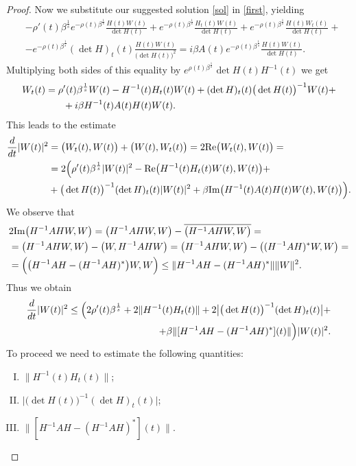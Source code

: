 \documentclass[12pt,oneside,a4paper]{book}
\numberwithin{equation}{section}     %
\theoremstyle{plain}
\theoremstyle{definition}
\newcommand{\Rep}{{\rm Re}}
\newcommand{\Imp}{{\rm Im}}
\begin{document}
\begin{proof}
	Now we substitute our suggested solution \eqref{sol} in \eqref{first}, yielding
	\begin{align*}
	&-\rho'(t)\beta^\frac{1}{s}e^{-\rho(t)\beta^\frac{1}{s}}\frac{H(t)W(t)}{\det H(t)}+e^{-\rho(t)\beta^\frac{1}{s}}\frac{H_t(t)W(t)}{\det H(t)}+e^{-\rho(t)\beta^\frac{1}{s}}\frac{H(t)W_t(t)}{\det H(t)}+\\
	&-e^{-\rho(t)\beta^\frac{1}{s}}(\det H)_t(t)\frac{H(t)W(t)}{\big(\det H(t)\big)^2}=i\beta A(t)e^{-\rho(t)\beta^\frac{1}{s}}\frac{H(t)W(t)}{\det H(t)}.
	\end{align*}
	Multiplying both sides of this equality  by $e^{\rho(t)\beta^{\frac{1}{s}}}\det H(t)H^{-1}(t)$ we get
	\begin{align}\notag
	W_t(t)=\rho&'(t)\beta^{\frac{1}{s}}W(t)-H^{-1}(t)H_t(t)W(t)+(\det H)_t(t)\big(\det H(t)\big)^{-1}W(t)+\\
	&+i\beta H^{-1}(t)A(t)H(t)W(t).\label{W}
	\end{align}
	This leads to the estimate
	\begin{align*}
	\frac{d}{dt}|W(t)|^{2}&=\big(W_{t}(t),W(t)\big)+\big(W(t),W_t(t)\big)=2\Rep\big{(}W_t(t),W(t)\big{)}=\\
	&=2\Big(\rho'(t)\beta^{\frac{1}{s}}|W(t)|^2-\Rep\big(H^{-1}(t)H_t(t)W(t),W(t)\big)+\\
	&+\big(\det H(t)\big)^{-1}(\det H)_t(t)|W(t)|^2+\beta\Imp\big(H^{-1}(t)A(t)H(t)W(t),W(t)\big)\Big).
	\end{align*}
	We observe that
	\begin{align*}
	&2\Imp\big(H^{-1}AHW,W\big)=\big(H^{-1}AHW,W\big)-\overline{\big(H^{-1}AHW,W\big)}=\\
	&=\big(H^{-1}AHW,W\big)-\big(W,H^{-1}AHW\big)=\big(H^{-1}AHW,W\big)-\big((H^{-1}AH)^*W,W\big)=\\
	&=\Big(\big(H^{-1}AH-(H^{-1}AH)^*\big)W,W\Big)\leq\|H^{-1}AH-(H^{-1}AH)^*\|\|W\|^2.
	\end{align*}
	Thus we obtain
	\begin{align}\notag
	\frac{d}{dt}|W(t)|^2\leq \Big(2\rho'(t)\beta^{\frac{1}{s}}+2\|H^{-1}(t)H_t(t)\|+2\big|\big(\det H(t)\big)^{-1}(\det H)_t(t)\big|+\\\label{enW}
	+\beta \|[H^{-1}AH-(H^{-1}AH)^*](t)\| \Big)|W(t)|^2.
	\end{align}
	To proceed we need to estimate the following quantities:
	\begin{enumerate}[I)]
		\item $\|H^{-1}(t)H_t(t)\|$;
		\item $\big|\big(\det H(t)\big)^{-1}(\det H)_t(t)\big|$;
		\item $\|[H^{-1}AH-(H^{-1}AH)^*](t)\|$.
	\end{enumerate}
	

\end{proof}
\end{document}
